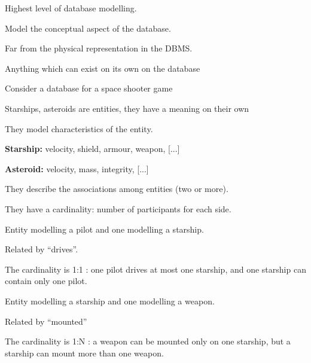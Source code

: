 \documentclass{beamer}
\begin{document}
\begin{slide}{
\item Highest level of database modelling.
\item Model the conceptual aspect of the database.
\item Far from the physical representation in the DBMS.
}\end{slide}

\begin{slide}{
\item Anything which can exist on its own on the database
\item Consider a database for a space shooter game
\item Starships, asteroids are entities, they have a meaning on their own

}\end{slide}

\begin{slide}{
\item They model characteristics of the entity.
\item \textbf{Starship:} velocity, shield, armour, weapon, [...]
\item \textbf{Asteroid:} velocity, mass, integrity, [...]

}\end{slide}

\begin{slide}{
\item They describe the associations among entities (two or more).
\item They have a cardinality: number of participants for each side.

}\end{slide}

\begin{slide}{
\item Entity modelling a pilot and one modelling a starship.
\item Related by ``drives''.
\item The cardinality is 1:1 : one pilot drives at most one starship, and one starship can contain only one pilot.

}\end{slide}

\begin{slide}{
\item Entity modelling a starship and one modelling a weapon.
\item Related by ``mounted''
\item The cardinality is 1:N : a weapon can be mounted only on one starship, but a starship can mount more than one weapon.

}\end{slide}
\end{document}
